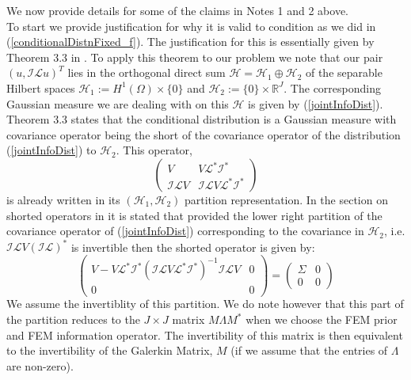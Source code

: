 We now provide details for some of the claims in Notes 1 and 2 above. \\

To start we provide justification for why it is valid to condition as we did in (\ref{conditionalDistnFixed_f}). The justification for this is essentially given by Theorem 3.3 in \cite{owhadi2015conditioning}. To apply this theorem to our problem we note that our pair $(u,\mathcal{I}\mathcal{L}u)^{T}$ lies in the orthogonal direct sum $\mathcal{H}=\mathcal{H}_1\oplus\mathcal{H}_{2}$ of the separable Hilbert spaces $\mathcal{H}_{1}:=H^{1}(\Omega)\times\{0\}$ and $\mathcal{H}_{2}:=\{0\}\times\mathbb{R}^{J}$. The corresponding Gaussian measure we are dealing with on this $\mathcal{H}$ is given by (\ref{jointInfoDist}). Theorem 3.3 states that the conditional distribution is a Gaussian measure with covariance operator being the short of the covariance operator of the distribution (\ref{jointInfoDist}) to $\mathcal{H}_{2}$. This operator,
\begin{equation}
    \begin{pmatrix}
    V & V\mathcal{L}^{*}\mathcal{I}^{*} \\
    \mathcal{I}\mathcal{L}V & \mathcal{I}\mathcal{L}V\mathcal{L}^{*}\mathcal{I}^{*}
    \end{pmatrix}
\end{equation}
is already written in its $(\mathcal{H}_1,\mathcal{H}_2)$ partition representation. In the section on shorted operators in \cite{owhadi2015conditioning} it is stated that provided the lower right partition of the covariance operator of (\ref{jointInfoDist}) corresponding to the covariance in $\mathcal{H}_2$, i.e. $\mathcal{I}\mathcal{L}V(\mathcal{I}\mathcal{L})^{*}$ is invertible then the shorted operator is given by:
\begin{equation}
    \begin{pmatrix}
        V-V\mathcal{L}^{*}\mathcal{I}^{*}(\mathcal{I}\mathcal{L}V\mathcal{L}^{*}\mathcal{I}^{*})^{-1}\mathcal{I}\mathcal{L}V & 0 \\
        0 & 0
    \end{pmatrix}=\begin{pmatrix}
                    \Sigma & 0 \\
                    0 & 0
                  \end{pmatrix}
\end{equation}
We assume the invertiblity of this partition. We do note however that this part of the partition reduces to the $J\times J$ matrix $M\Lambda M^{*}$ when we choose the FEM prior and FEM information operator. The invertibility of this matrix is then equivalent to the invertibility of the Galerkin Matrix, $M$ (if we assume that the entries of $\Lambda$ are non-zero). \\

